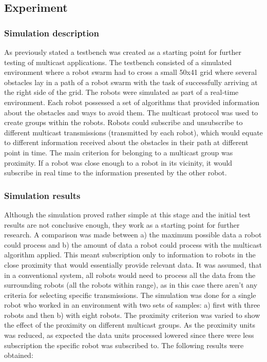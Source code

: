 \documentclass[journal]{IEEEtran}
\begin{document}
\begin{itemize}
\section{Experiment}
\subsubsection{Simulation description}
As previously stated a testbench was created as a starting point for further testing of multicast applications.  The testbench consisted of a simulated environment where a robot swarm had to cross a small 50x41 grid where several obstacles lay in a path of a robot swarm with the task of successfully arriving at the right side of the grid. The robots were simulated as part of a real-time environment. Each robot possessed a set of algorithms that provided information about the obstacles and ways to avoid them. The multicast protocol was used to create groups within the robots.  Robots could subscribe and unsubscribe to different multicast transmissions (transmitted by each robot), which would equate to different information received about the obstacles in their path at different point in time. The main criterion for belonging to a multicast group was proximity. If a robot was close enough to a robot in its vicinity, it would subscribe in real time to the information presented by the other robot. 
\subsubsection{Simulation results}
Although the simulation proved rather simple at this stage and the initial test results are not conclusive enough, they work as a starting point for further research. A comparison was made between a) the maximum possible data a robot could process and b) the amount of data a robot could process with the multicast algorithm applied. This meant subscription only to information to robots in the close proximity that would essentially provide relevant data.  It was assumed, that in a conventional system, all robots would need to process all the data from the surrounding robots (all the robots within range), as in this case there aren’t any criteria for selecting specific transmissions. 
The simulation was done for a single robot who worked in an environment with two sets of samples: a) first with three robots and then b) with eight robots. The proximity criterion was varied to show the effect of the proximity on different multicast groups. As the proximity units was reduced, as expected the data units processed lowered since there were less subscription the specific robot was subscribed to.
The following results were obtained:


\end{itemize}
\end{document}
